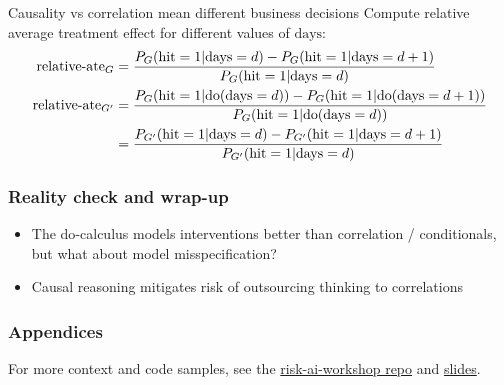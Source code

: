 \begin{frame}{Causality vs correlation mean different business decisions}
    Compute relative average treatment effect for different values of $\textrm{days}$:
    \begin{align*}
        \textrm{relative-ate}_G &= \frac{
            P_G(\textrm{hit}=1 | \textrm{days}=d) - P_G(\textrm{hit}=1 | \textrm{days}=d+1)
        }{P_G(\textrm{hit}=1 | \textrm{days}=d)} \\
        \textrm{relative-ate}_{G'} &= \frac{
            P_G(\textrm{hit}=1 | \mathrm{do}(\textrm{days}=d)) - P_G(\textrm{hit}=1 | \mathrm{do}(\textrm{days}=d+1))
        }{P_G(\textrm{hit}=1 | \mathrm{do}(\textrm{days}=d))} \\
        & = \frac{
            P_{G'}(\textrm{hit}=1 | \textrm{days}=d) - P_{G'}(\textrm{hit}=1 | \textrm{days}=d+1)
        }{P_{G'}(\textrm{hit}=1 | \textrm{days}=d)}
    \end{align*}
    \begin{center}
        
    \end{center}
\end{frame}


\begin{frame}
    \frametitle{Reality check and wrap-up}
    \begin{itemize}
        \item The \textrm{do}-calculus models interventions better than correlation / conditionals, but what about model misspecification?
        \item Causal reasoning mitigates risk of outsourcing thinking to correlations
    \end{itemize}
\end{frame}

\begin{frame}
    \frametitle{Appendices}
    For more context and code samples, see the \href{https://github.com/munichpavel/risk-ai-workshop/}{risk-ai-workshop repo} and \href{https://github.com/munichpavel/risk-ai-workshop/releases/tag/v2022.1.2}{slides}.
\end{frame}

